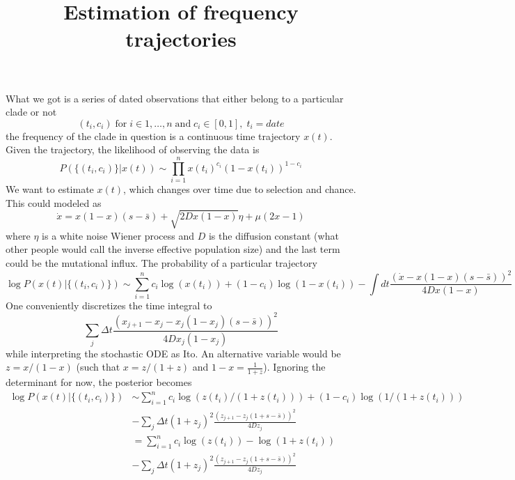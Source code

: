 \documentclass[11pt]{article}
\title{Estimation of frequency trajectories}
\begin{document}
\maketitle
What we got is a series of dated observations that either belong to a particular clade or not
\begin{equation}
    (t_i, c_i) \; \mathrm{for}\; i\in 1,\ldots,n \; \mathrm{and}\; c_i\in[0,1],\; t_i = date
\end{equation}
the frequency of the clade in question is a continuous time trajectory $x(t)$. Given the 
trajectory, the likelihood of observing the data is
\begin{equation}
    P(\{(t_i, c_i)\}|x(t)) \sim \prod_{i=1}^n x(t_i)^{c_i}(1-x(t_i))^{1-c_i}
\end{equation}
We want to estimate $x(t)$, which changes over time due to selection and chance. This could 
modeled as 
\begin{equation}
    \dot{x} = x(1-x) (s-\bar{s}) + \sqrt{2Dx(1-x)}\eta + \mu(2x-1)
\end{equation}
where $\eta$ is a white noise Wiener process and $D$ is the diffusion constant (what other 
people would call the inverse effective population size) and the last term could be 
the mutational influx. The probability of a particular trajectory 
\begin{equation}
    \log P(x(t) | \{(t_i, c_i)\} ) \sim \sum_{i=1}^n c_i\log(x(t_i)) + (1-c_i)\log(1-x(t_i))
     - \int dt \frac{(\dot{x}-x(1-x)(s-\bar{s}))^2}{4Dx(1-x)}
\end{equation}
One conveniently discretizes the time integral to 
\begin{equation}
    \sum_j \Delta t \frac{(x_{j+1}-x_j-x_j(1-x_j)(s-\bar{s}))^2}{4Dx_j(1-x_j)} 
\end{equation}
while interpreting the stochastic ODE as Ito.
An alternative variable would be $z = x/(1-x)$ (such that $x = z/(1+z)$ and 
$1-x = \frac{1}{1+z}$). Ignoring the determinant for now, the posterior becomes
\begin{equation}
\begin{split}
    \log P(x(t) | \{(t_i, c_i)\} ) & \sim \sum_{i=1}^n c_i\log(z(t_i)/(1+z(t_i))) + (1-c_i)\log(1/(1+z(t_i)))\\
    &-\sum_j \Delta t (1+z_j)^2\frac{(z_{j+1}-z_j(1+s-\bar{s}))^2}{4Dz_j}     \\
    &=\sum_{i=1}^n c_i\log(z(t_i)) - \log(1+z(t_i))\\
    &-\sum_j \Delta t (1+z_j)^2\frac{(z_{j+1}-z_j(1+s-\bar{s}))^2}{4Dz_j} 
\end{split}
\end{equation}
\end{document}
